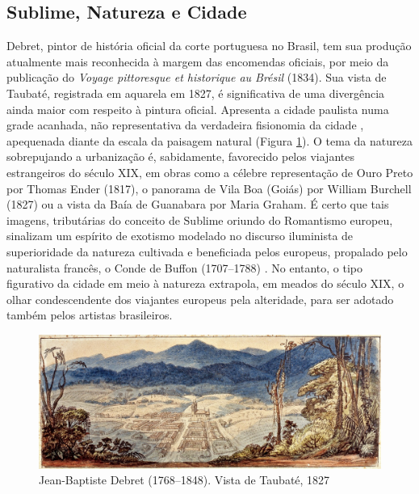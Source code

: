 \hypertarget{sublime-natureza-e-cidade}{%
\subsection{Sublime, Natureza e
Cidade}\label{sublime-natureza-e-cidade}}

Debret, pintor de história oficial da corte portuguesa no Brasil, tem
sua produção atualmente mais reconhecida à margem das encomendas
oficiais, por meio da publicação do \emph{Voyage pittoresque et
historique au Brésil} (1834). Sua vista de Taubaté, registrada em
aquarela em 1827, é significativa de uma divergência ainda maior com
respeito à pintura oficial. Apresenta a cidade paulista numa grade
acanhada, não representativa da verdadeira fisionomia da cidade
\autocite{almanaqueurupes:2013arquiteto}, apequenada diante da escala da
paisagem natural (Figura \ref{fig:taubate}). O tema da natureza
sobrepujando a urbanização é, sabidamente, favorecido pelos viajantes
estrangeiros do século XIX, em obras como a célebre representação de
Ouro Preto por Thomas Ender (1817), o panorama de Vila Boa (Goiás) por
William Burchell (1827) ou a vista da Baía de Guanabara por Maria
Graham. É certo que tais imagens, tributárias do conceito de Sublime
oriundo do Romantismo europeu, sinalizam um espírito de exotismo
modelado no discurso iluminista de superioridade da natureza cultivada e
beneficiada pelos europeus, propalado pelo naturalista francês, o Conde
de Buffon (1707--1788) \autocite{palazzo:2002mitos}. No entanto, o tipo
figurativo da cidade em meio à natureza extrapola, em meados do século
XIX, o olhar condescendente dos viajantes europeus pela alteridade, para
ser adotado também pelos artistas brasileiros.

\begin{figure}
\hypertarget{fig:taubate}{%
\centering
\includegraphics{figures/jb_debret_taubate.jpeg}
\caption{Jean-Baptiste Debret (1768--1848). Vista de Taubaté,
1827}\label{fig:taubate}
}
\end{figure}

